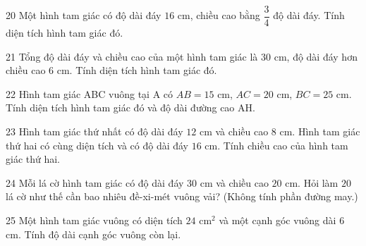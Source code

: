 \gap
\begin{probbox}{20}{\relax}
Một hình tam giác có độ dài đáy $16$ cm, chiều cao bằng $\dfrac34$ độ dài đáy. Tính diện tích hình tam giác đó.
\end{probbox}
\gap
\begin{probbox}{21}{\relax}
Tổng độ dài đáy và chiều cao của một hình tam giác là $30$ cm, độ dài đáy hơn chiều cao $6$ cm. Tính diện tích hình tam giác đó.
\end{probbox}
\gap
\begin{probbox}{22}{\relax}
Hình tam giác ABC vuông tại A có $AB=15$ cm, $AC=20$ cm, $BC=25$ cm. Tính diện tích hình tam giác đó và độ dài đường cao AH.
\end{probbox}
\gap
\begin{probbox}{23}{\relax}
Hình tam giác thứ nhất có độ dài đáy $12$ cm và chiều cao $8$ cm. Hình tam giác thứ hai có cùng diện tích và có độ dài đáy $16$ cm. Tính chiều cao của hình tam giác thứ hai.
\end{probbox}
\gap
\begin{probbox}{24}{\relax}
Mỗi lá cờ hình tam giác có độ dài đáy $30$ cm và chiều cao $20$ cm. Hỏi làm $20$ lá cờ như thế cần bao nhiêu đề-xi-mét vuông vải? (Không tính phần đường may.)
\end{probbox}
\gap
\begin{probbox}{25}{\relax}
Một hình tam giác vuông có diện tích $24$ cm$^2$ và một cạnh góc vuông dài $6$ cm. Tính độ dài cạnh góc vuông còn lại.
\end{probbox}
